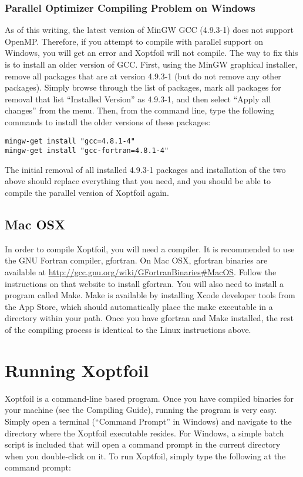 \documentclass[11pt]{article}
\begin{document}
\subsubsection{Parallel Optimizer Compiling Problem on Windows}

As of this writing, the latest version of MinGW GCC (4.9.3-1) does not support OpenMP.
Therefore, if you attempt to compile with parallel support on Windows, you will get an
error and Xoptfoil will not compile.  The way to fix this is to install an older version
of GCC.  First, using the MinGW graphical installer, remove all packages that are at 
version 4.9.3-1 (but do not remove any other packages). Simply browse through the list of
packages, mark all packages for removal that list ``Installed Version'' as 4.9.3-1, and 
then select ``Apply all changes'' from the menu.  Then, from the command line, type 
the following commands to install the older versions of these packages:

\begin{verbatim}
mingw-get install "gcc=4.8.1-4"
mingw-get install "gcc-fortran=4.8.1-4"
\end{verbatim}

The initial removal of all installed 4.9.3-1 packages and installation of the two above
should replace everything that you need, and you should be able to compile the parallel
version of Xoptfoil again.

\subsection{Mac OSX}

In order to compile Xoptfoil, you will need a compiler.  It is recommended to use the GNU
Fortran compiler, gfortran.  On Mac OSX, gfortran binaries are available at 
\url{http://gcc.gnu.org/wiki/GFortranBinaries#MacOS}.  Follow the instructions on that
website to install gfortran.  You will also need to install a program called Make.  Make
is available by installing Xcode developer tools from the App Store, which should
automatically place the make executable in a directory within your path. Once you have
gfortran and Make installed, the rest of the compiling process is identical to the Linux
instructions above.

\section{Running Xoptfoil}\label{sec:running}

Xoptfoil is a command-line based program.  Once you have compiled binaries for your
machine (see the Compiling Guide), running the program is very easy.  Simply open a
terminal (``Command Prompt'' in Windows) and navigate to the directory where the Xoptfoil
executable resides.  For Windows, a simple batch script is included that will open a
command prompt in the current directory when you double-click on it.  To run Xoptfoil,
simply type the following at the command prompt:
\end{document}
